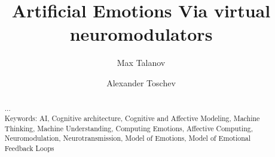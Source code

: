 \documentclass[oribibl]{llncs}
\begin{document}
\title{Artificial Emotions Via virtual neuromodulators}
\author{Max Talanov \and Alexander Toschev}
\maketitle
\begin{abstract}
...\\
Keywords: AI, Cognitive architecture, Cognitive and Affective Modeling, Machine Thinking, Machine Understanding, Computing Emotions, Affective Computing, Neuromodulation, Neurotransmission, Model of Emotions, Model of Emotional Feedback Loops
\end{abstract}



\end{document}

